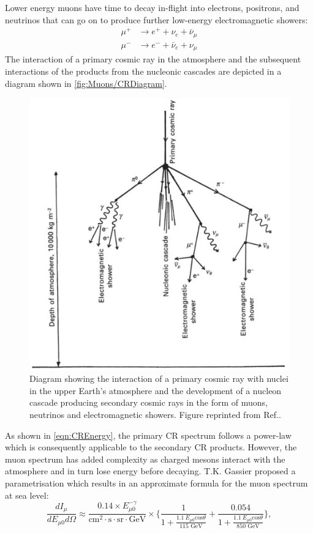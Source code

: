 Lower energy muons have time to decay in-flight into electrons, positrons, and neutrinos that can go on to produce further low-energy electromagnetic showers:
\begin{equation}
\begin{split}    
    \mu^+&\rightarrow e^++\nu_e+\bar\nu_\mu \\
    \mu^-&\rightarrow e^-+\bar\nu_e+\nu_\mu
\end{split}
\end{equation}
The interaction of a primary cosmic ray in the atmosphere and the subsequent interactions of the products from the nucleonic cascades are depicted in a diagram shown in \autoref{fig:Muons/CRDiagram}.
\begin{figure}[ht!]
    \centering
    \includegraphics[width=0.7\linewidth]{figures/Muons/MuonShower.png}
    \caption{Diagram showing the interaction of a primary cosmic ray with nuclei in the upper Earth's atmosphere and the development of a nucleon cascade producing secondary cosmic rays in the form of muons, neutrinos and electromagnetic showers. Figure reprinted from Ref.\cite{Longair_2011}.}
    \label{fig:Muons/CRDiagram}
\end{figure}
As shown in \autoref{eqn:CREnergy}, the primary CR spectrum follows a power-law which is consequently applicable to the secondary CR products. However, the muon spectrum has added complexity as charged mesons interact with the atmosphere and in turn lose energy before decaying. T.K. Gassier proposed a parametrisation \cite{Gaisser_Engel_Resconi_2016} which results in an approximate formula for the muon spectrum at sea level:
\begin{equation}
    \label{eqn:MuonIntensitySurfaceEarth1}
    \frac{dI_\mu}{dE_{\mu0}d\Omega}\approx\frac{0.14\times E^{-\gamma}_{\mu0}}{\text{cm}^2\cdot\text{s}\cdot\text{sr}\cdot\text{GeV}}\times\Biggl\{\frac{1}{1+\frac{1.1\:E_{\mu0}\text{cos}\theta}{115\text{ GeV}}}+\frac{0.054}{1+\frac{1.1\:E_{\mu0}\text{cos}\theta}{850\text{ GeV}}}\Biggl\},
\end{equation}
